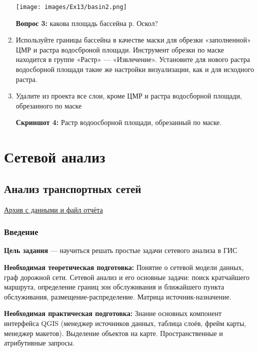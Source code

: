 \documentclass[
  12pt,
]{book}
\begin{document}
\begin{enumerate}
  \texttt{[image: images/Ex13/basin2.png]}

  \textbf{Вопрос 3:} какова площадь бассейна р. Оскол?
\item
  Используйте границы бассейна в качестве маски для обрезки «заполненной» ЦМР и растра водосброной площади. Инструмент обрезки по маске находится в группе «Растр» --- «Извлечение». Установите для нового растра водосборной площади такие же настройки визуализации, как и для исходного растра.
\item
  Удалите из проекта все слои, кроме ЦМР и растра водосборной площади, обрезанного по маске

  \textbf{Скриншот 4:} Растр водоосборной площади, обрезанный по маске.
\end{enumerate}

\hypertarget{part-ux441ux435ux442ux435ux432ux43eux439-ux430ux43dux430ux43bux438ux437}{%
\part{Сетевой анализ}\label{part-ux441ux435ux442ux435ux432ux43eux439-ux430ux43dux430ux43bux438ux437}}

\hypertarget{networks}{%
\chapter{Анализ транспортных сетей}\label{networks}}

\href{https://1drv.ms/u/s!AmtmZDq3JgxHgZ0j1tgKv_d1ElUpow?e=s0gsKz}{Архив с данными и файл отчёта}

\hypertarget{networks-intro}{%
\section{Введение}\label{networks-intro}}

\textbf{Цель задания} --- научиться решать простые задачи сетевого анализа в ГИС

\textbf{Необходимая теоретическая подготовка:} Понятие о сетевой модели данных, граф дорожной сети. Сетевой анализ и его основные задачи: поиск кратчайшего маршрута, определение границ зон обслуживания и ближайшего пункта обслуживания, размещение-распределение. Матрица источник-назначение.

\textbf{Необходимая практическая подготовка:} Знание основных компонент интерфейса QGIS (менеджер источников данных, таблица слоёв, фрейм карты, менеджер макетов). Выделение объектов на карте. Пространственные и атрибутивные запросы.
\end{document}
